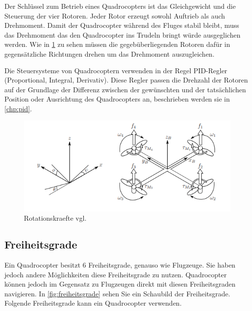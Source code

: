 Der Schlüssel zum Betrieb eines Quadrocopters ist das Gleichgewicht und die Steuerung der vier Rotoren. Jeder Rotor erzeugt sowohl Auftrieb als auch Drehmoment. Damit der Quadrocopter während des Fluges stabil bleibt, muss das Drehmoment das den Quadrocopter ins Trudeln bringt würde ausgeglichen werden. Wie in \ref{fig:frames} zu sehen müssen die gegebüberliegenden Rotoren dafür in gegensätzliche Richtungen drehen um das Drehmoment auszugleichen.

Die Steuersysteme von Quadrocoptern verwenden in der Regel PID-Regler (Proportional, Integral, Derivativ). Diese Regler passen die Drehzahl der Rotoren auf der Grundlage der Differenz zwischen der gewünschten und der tatsächlichen Position oder Ausrichtung des Quadrocopters an, beschrieben werden sie in \ref{chp:pid}.

\cite[vgl.][Quadrocopter Kinematic and Dynamics]{Valavanis2015}

\begin{figure}
    \begin{centering}
        \includegraphics[scale=0.6]{images/inertial_body_frames.png}
        \caption{\label{fig:frames}Rotationskraefte vgl. \cite{luukkonen2011modelling}}
    \end{centering}
\end{figure}


\subsection{Freiheitsgrade}

Ein Quadrocopter besitzt 6 Freiheitsgrade, genauso wie Flugzeuge. Sie haben jedoch andere Möglichkeiten diese Freiheitsgrade zu nutzen.
Quadrocopter können jedoch im Gegensatz zu Flugzeugen direkt mit diesen Freiheitsgraden navigieren. In \ref{fig:freiheitsgrade} sehen Sie ein Schaubild der Freiheitsgrade.
Folgende Freiheitsgrade kann ein Quadrocopter verwenden.

